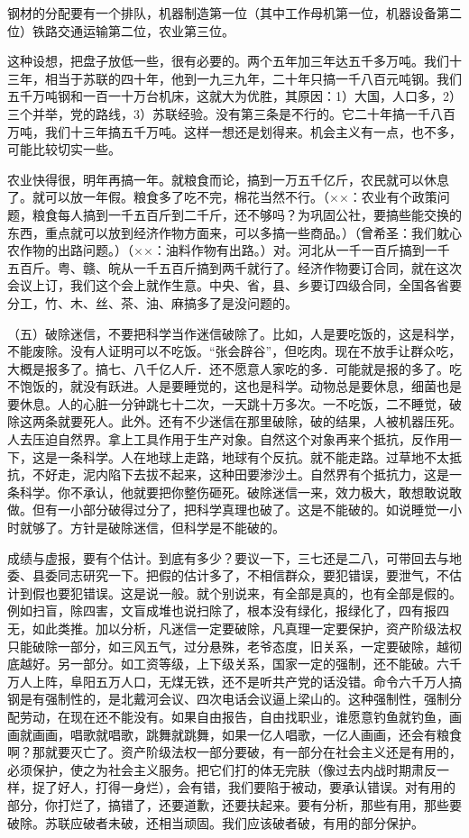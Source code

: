 钢材的分配要有一个排队，机器制造第一位（其中工作母机第一位，机器设备第二位）铁路交通运输第二位，农业第三位。

这种设想，把盘子放低一些，很有必要的。两个五年加三年达五千多万吨。我们十三年，相当于苏联的四十年，他到一九三九年，二十年只搞一千八百元吨钢。我们五千万吨钢和一百一十万台机床，这就大为优胜，其原因：1）大国，人口多，2）三个并举，党的路线，3）苏联经验。没有第三条是不行的。它二十年搞一千八百万吨，我们十三年搞五千万吨。这样一想还是划得来。机会主义有一点，也不多，可能比较切实一些。

农业快得很，明年再搞一年。就粮食而论，搞到一万五千亿斤，农民就可以休息了。就可以放一年假。粮食多了吃不完，棉花当然不行。（××：农业有个政策问题，粮食每人搞到一千五百斤到二千斤，还不够吗？为巩固公社，要搞些能交换的东西，重点就可以放到经济作物方面来，可以多搞一些商品。）（曾希圣：我们躭心农作物的出路问题。）（××：油料作物有出路。）对。河北从一千一百斤搞到一千五百斤。粤、赣、皖从一千五百斤搞到两千就行了。经济作物要订合同，就在这次会议上订，我们这个会上就作生意。中央、省，县、乡要订四级合同，全国各省要分工，竹、木、丝、茶、油、麻搞多了是没问题的。

（五）破除迷信，不要把科学当作迷信破除了。比如，人是要吃饭的，这是科学，不能废除。没有人证明可以不吃饭。“张会辟谷”，但吃肉。现在不放手让群众吃，大概是报多了。搞七、八千亿人斤．还不愿意人家吃的多．可能就是报的多了。吃不饱饭的，就没有跃进。人是要睡觉的，这也是科学。动物总是要休息，细菌也是要休息。人的心脏一分钟跳七十二次，一天跳十万多次。一不吃饭，二不睡觉，破除这两条就要死人。此外。还有不少迷信在那里破除，破的结果，人被机器压死。人去压迫自然界。拿上工具作用于生产对象。自然这个对象再来个抵抗，反作用一下，这是一条科学。人在地球上走路，地球有个反抗。就不能走路。过草地不太抵抗，不好走，泥内陷下去拔不起来，这种田要渗沙土。自然界有个抵抗力，这是一条科学。你不承认，他就要把你整伤砸死。破除迷信一来，效力极大，敢想敢说敢做。但有一小部分破得过分了，把科学真理也破了。这是不能破的。如说睡觉一小时就够了。方针是破除迷信，但科学是不能破的。

成绩与虚报，要有个估计。到底有多少？要议一下，三七还是二八，可带回去与地委、县委同志研究一下。把假的估计多了，不相信群众，要犯错误，要泄气，不估计到假也要犯错误。这是说一般。就个别说来，有全部是真的，也有全部是假的。例如扫盲，除四害，文盲成堆也说扫除了，根本没有绿化，报绿化了，四有报四无，如此类推。加以分析，凡迷信一定要破除，凡真理一定要保护，资产阶级法权只能破除一部分，如三风五气，过分悬殊，老爷态度，旧关系，一定要破除，越彻底越好。另一部分。如工资等级，上下级关系，国家一定的强制，还不能破。六千万人上阵，阜阳五万人口，无煤无铁，还不是听共产党的话没错。命令六千万人搞钢是有强制性的，是北戴河会议、四次电话会议逼上梁山的。这种强制性，强制分配劳动，在现在还不能没有。如果自由报告，自由找职业，谁愿意钓鱼就钓鱼，画画就画画，唱歌就唱歌，跳舞就跳舞，如果一亿人唱歌，一亿人画画，还会有粮食啊？那就要灭亡了。资产阶级法权一部分要破，有一部分在社会主义还是有用的，必须保护，使之为社会主义服务。把它们打的体无完肤（像过去内战时期肃反一样，捉了好人，打得一身烂），会有错，我们要陷于被动，要承认错误。对有用的部分，你打烂了，搞错了，还要道歉，还要扶起来。要有分析，那些有用，那些要破除。苏联应破者未破，还相当顽固。我们应该破者破，有用的部分保护。

